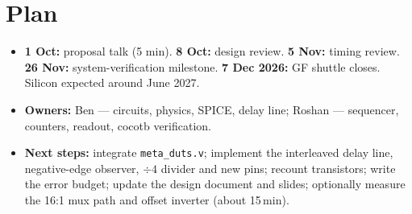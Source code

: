 \documentclass[11pt]{article}
\begin{document}
\section{Plan}
\begin{itemize}
\item \textbf{1 Oct:} proposal talk (5 min). \textbf{8 Oct:} design review. \textbf{5 Nov:} timing review.
  \textbf{26 Nov:} system-verification milestone. \textbf{7 Dec 2026:} GF shuttle closes.
  Silicon expected around June 2027.
\item \textbf{Owners:} Ben --- circuits, physics, SPICE, delay line; Roshan --- sequencer, counters, readout, cocotb verification.
\item \textbf{Next steps:} integrate \texttt{meta\_duts.v}; implement the interleaved delay line, negative-edge observer,
  $\div4$ divider and new pins; recount transistors; write the error budget; update the design document and slides;
  optionally measure the 16:1 mux path and offset inverter (about 15\,min).
\end{itemize}

\end{document}

